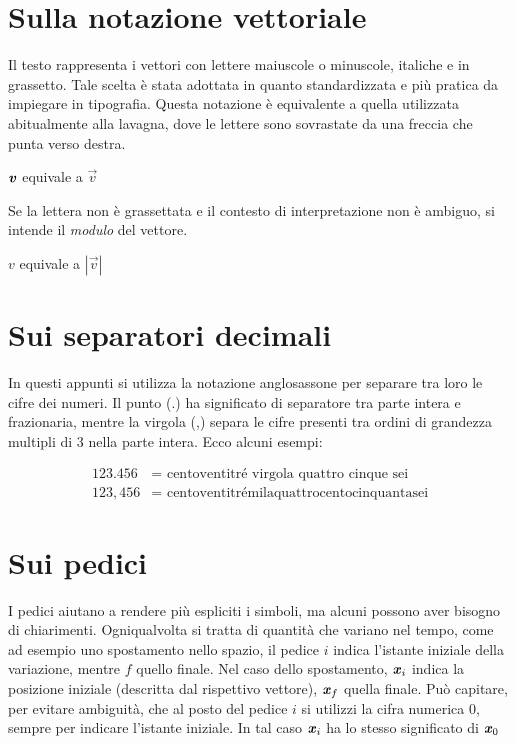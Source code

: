 
\section{Sulla notazione vettoriale}
Il testo rappresenta i vettori con lettere maiuscole o minuscole,
italiche e in grassetto. Tale scelta è stata adottata in quanto
standardizzata e più pratica da impiegare in tipografia. Questa notazione
è equivalente a quella utilizzata abitualmente alla lavagna, dove
le lettere sono sovrastate da una freccia che punta verso destra.

\begin{center}
    $\textbf{\textit{v}}$ equivale a $\vec{v}$
\end{center}

\noindent Se la lettera non è grassettata e il contesto di interpretazione
non è ambiguo, si intende il \textit{modulo} del vettore.

\begin{center}
    $v$ equivale a $|\vec{v}|$
\end{center}


\section{Sui separatori decimali}
In questi appunti si utilizza la notazione anglosassone per separare tra
loro le cifre dei numeri. Il punto (.) ha significato di separatore tra
parte intera e frazionaria, mentre la virgola (,) separa le cifre presenti
tra ordini di grandezza multipli di 3 nella parte intera. Ecco alcuni
esempi:

\begin{align*}
    123.456 &= \text{ centoventitré virgola quattro cinque sei}\\
    123,456 &= \text{ centoventitrémilaquattrocentocinquantasei}
\end{align*}

\section{Sui pedici}
I pedici aiutano a rendere più espliciti i simboli, ma alcuni possono
aver bisogno di chiarimenti. Ogniqualvolta si tratta di quantità che
variano nel tempo, come ad esempio uno spostamento nello spazio, il
pedice $i$ indica l'istante iniziale della variazione, mentre $f$
quello finale. Nel caso dello spostamento, $\textbf{\textit{x}}_i$ indica la
posizione iniziale (descritta dal rispettivo vettore), $\textbf{\textit{x}}_f$
quella finale. Può capitare, per evitare ambiguità, che al posto del
pedice $i$ si utilizzi la cifra numerica 0, sempre per indicare
l'istante iniziale. In tal caso $\textbf{\textit{x}}_i$ ha lo stesso significato
di $\textbf{\textit{x}}_0$

